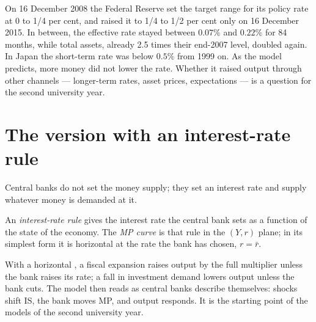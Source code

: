 \begin{record}
On 16 December 2008 the Federal Reserve set the target range for its
policy rate at 0 to 1/4 per cent, and raised it to 1/4 to 1/2 per cent only
on 16 December 2015. %
In between, the effective rate stayed between $0.07\%$ and $0.22\%$ for 84
months, while total assets, already 2.5 times their end-2007 level, doubled
again. %
In Japan the short-term rate was below $0.5\%$ from 1999 on. %
As the model predicts, more money did not lower the rate. Whether it
raised output through other channels --- longer-term rates, asset prices,
expectations --- is a question for the second university year.
\end{record}

\section{The version with an interest-rate rule}\label{sec:b1:is-lm:mp}

Central banks do not set the money supply; they set an interest rate and
supply whatever money is demanded at it.

\begin{definition}\label{def:b1:is-lm:mp}
An \emph{interest-rate rule} gives the interest rate the central bank sets
as a function of the state of the economy. The \emph{MP curve} is that rule in
the $(Y, r)$ plane; in its simplest form it is horizontal at the rate the
bank has chosen, $r = \bar r$.
\end{definition}

With a horizontal , a fiscal expansion raises output by the full
multiplier unless the bank raises its rate; a fall in investment demand
lowers output unless the bank cuts. The model then reads as central banks
describe themselves: shocks shift IS, the bank moves MP, and output
responds. It is the starting point of the models of the second university
year.

